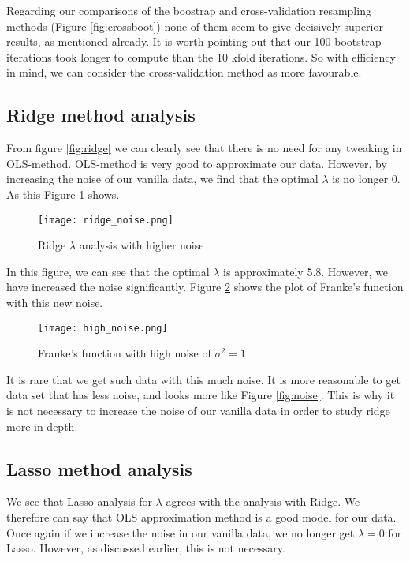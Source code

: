 \documentclass[reprint,english,notitlepage]{revtex4-1}  %
\begin{document}
Regarding our comparisons of the boostrap and cross-validation resampling methods (Figure \ref{fig:crossboot}) none of them seem to give decisively superior results, as mentioned already. It is worth pointing out that our 100 bootstrap iterations took longer to compute than the 10 kfold iterations. So with efficiency in mind, we can consider the cross-validation method as more favourable.

\subsection{Ridge method analysis}
From figure \ref{fig:ridge} we can clearly see that there is no need for any tweaking in OLS-method. OLS-method is very good to approximate our data. However, by increasing the noise of our vanilla data, we find that the optimal $\lambda$ is no longer 0. As this Figure \ref{fig:ridge_noise} shows.

\begin{figure}[h!]
    \centering
    \texttt{[image: ridge\_noise.png]}
    \caption{Ridge $\lambda$ analysis with higher noise}
    \label{fig:ridge_noise}
\end{figure}

In this figure, we can see that the optimal $\lambda$ is approximately 5.8. However, we have increased the noise significantly. Figure \ref{fig:high_noise} shows the plot of Franke's function with this new noise.
\begin{figure}[h!]
    \centering
    \texttt{[image: high\_noise.png]}
    \caption{Franke's function with high noise of $\sigma^2 = 1$ }
    \label{fig:high_noise}
\end{figure}
It is rare that we get such data with this much noise. It is more reasonable to get data set that has less noise, and looks more like Figure \ref{fig:noise}. This is why it is not necessary to increase the noise of our vanilla data in order to study ridge more in depth.



\subsection{Lasso method analysis}
We see that Lasso analysis for $\lambda$ agrees with the analysis with Ridge. We therefore can say that OLS approximation method is a good model for our data. Once again if we increase the noise in our vanilla data, we no longer get $\lambda = 0$ for Lasso. However, as discussed earlier, this is not necessary. 
\end{document}
